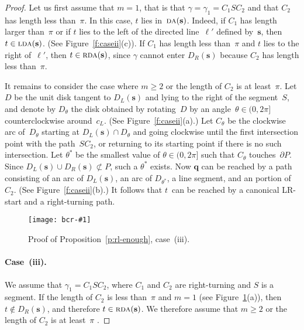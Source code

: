 \documentclass[a4paper]{article}
\newcommand{\vecs}{{\mathbf{s}}}
\newcommand{\vecq}{{\mathbf{q}}}
\newcommand{\ldisk}{{D_L}}
\newcommand{\rdisk}{{D_R}}
\newcommand{\bd}{\partial}
\newcommand{\thetastar}{\theta^{\ast}}
\DeclareMathOperator{\DA}{\textsc{da}}
\DeclareMathOperator{\LDA}{\textsc{lda}}
\DeclareMathOperator{\RDA}{\textsc{rda}}
\let\geq\geqslant
\newcommand{\epsfigure}[2]{
  \begin{figure}[htb]
    \centerline{\texttt{[image: bcr-\#1]}}
    \caption{#2}
    \label{f:#1}
  \end{figure}}
\begin{document}
\begin{proof}
  Let us first assume that $m = 1$, that is that $\gamma = \gamma_1 =
  C_1SC_2$ and that $C_2$ has length less than~$\pi$.  In this case,
  $t$ lies in~$\DA(\vecs)$.  Indeed, if $C_1$ has length larger
  than~$\pi$ or if $t$ lies to the left of the directed line~$\ell'$
  defined by~$\vecs$, then $t \in \LDA(\vecs)$. (See
  Figure~\ref{f:caseii}(c)). If $C_1$ has length less than~$\pi$ and
  $t$ lies to the right of~$\ell'$, then $t \in \RDA(\vecs)$, since
  $\gamma$ cannot enter $\rdisk(\vecs)$ because $C_2$ has length less
  than~$\pi$.

  It remains to consider the case where $m \geq 2$ or the length of
  $C_2$ is at least~$\pi$. Let $D$ be the unit disk tangent to
  $\ldisk(\vecs)$ and lying to the right of the segment~$S$, and
  denote by $D_\theta$ the disk obtained by rotating~$D$ by an
  angle~$\theta \in (0,2\pi]$ counterclockwise around~$c_L$.  (See
    Figure~\ref{f:caseii}(a).) Let $C_\theta$ be the clockwise arc
    of~$D_\theta$ starting at $D_L(\vecs) \cap D_\theta$ and going clockwise
    until the first intersection point with the path~$SC_2$, or
    returning to its starting point if there is no such intersection.
    Let $\thetastar$ be the smallest value of $\theta \in (0,2\pi]$
      such that $C_\theta$ touches~$\bd P$. Since $\ldisk(\vecs) \cup
      \rdisk(\vecs)\not\subset P$, such a $\thetastar$ exists.  Now
      $\vecq$ can be reached by a path consisting of an arc of
      $\ldisk(\vecs)$, an arc of $D_{\thetastar}$, a line segment, and
      an portion of~$C_2$. (See Figure~\ref{f:caseii}(b).)  It follows
      that $t$~can be reached by a canonical LR-start and a
      right-turning path.

\epsfigure{caseiii}{Proof of Proposition~\ref{p:rl-enough},
  case~(iii).}
\paragraph{Case~(iii).} We assume that $\gamma_1=C_1SC_2$,
  where $C_1$ and $C_2$ are right-turning and $S$ is a segment.  If
  the length of $C_2$ is less than~$\pi$ and $m=1$ (see
  Figure~\ref{f:caseiii}(a)), then $t \not \in \rdisk(\vecs)$, and
  therefore $t \in \RDA(\vecs)$.  We therefore assume that $m \geq 2$
  or the length of $C_2$ is at least~$\pi$ .


\end{proof}
\end{document}
